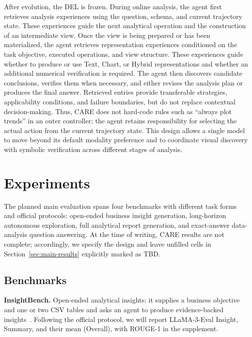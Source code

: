 \documentclass{article}
\newcommand{\method}{\textsc{CARE}}
\begin{document}
After evolution, the DEL is frozen.
During online analysis, the agent first retrieves analysis experiences using the question, schema, and current trajectory state.
These experiences guide the next analytical operation and the construction of an intermediate view.
Once the view is being prepared or has been materialized, the agent retrieves representation experiences conditioned on the task objective, executed operations, and view structure.
These experiences guide whether to produce or use Text, Chart, or Hybrid representations and whether an additional numerical verification is required.
The agent then discovers candidate conclusions, verifies them when necessary, and either revises the analysis plan or produces the final answer.
Retrieved entries provide transferable strategies, applicability conditions, and failure boundaries, but do not replace contextual decision-making.
Thus, \method{} does not hard-code rules such as ``always plot trends'' in an outer controller; the agent retains responsibility for selecting the actual action from the current trajectory state.
This design allows a single model to move beyond its default modality preference and to coordinate visual discovery with symbolic verification across different stages of analysis.

\section{Experiments}
\label{sec:experiments}

The planned main evaluation spans four benchmarks with different task forms and official protocols:
open-ended business insight generation, long-horizon autonomous exploration, full analytical report generation, and exact-answer data-analysis question answering.
At the time of writing, \method{} results are not complete; accordingly, we specify the design and leave unfilled cells in Section~\ref{sec:main-results} explicitly marked as TBD.

\subsection{Benchmarks}
\label{sec:benchmarks}

\noindent\textbf{InsightBench.} Open-ended analytical insights: it supplies a business objective and one or two CSV tables and asks an agent to produce evidence-backed insights~\citep{sahu2025insightbench}.
Following the official protocol, we will report LLaMA-3-Eval Insight, Summary, and their mean (Overall), with ROUGE-1 in the supplement.
\end{document}
